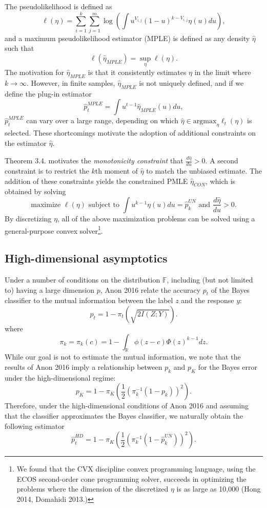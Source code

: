 \documentclass{article}
\newcommand{\argmax}{\text{argmax}}
\begin{document}
The pseudolikelihood is defined as
\begin{equation}\label{eq:psuedo}
\ell(\eta) = \sum_{i=1}^k \sum_{j=1}^{m} \log\left(\int u^{V_{i, j}} (1-u)^{k - V_{i, j}} \eta(u) du\right),
\end{equation}
and a maximum pseudolikelihood estimator (MPLE) is defined as any
density $\hat{\eta}$ such that
\[
\ell(\hat{\eta}_{MPLE}) = \sup_{\eta} \ell(\eta).
\]
The motivation for $\hat{\eta}_{MPLE}$ is that it consistently
estimates $\eta$ in the limit where $k \to \infty$.
However, in finite samples, $\hat{\eta}_{MPLE}$ is not uniquely defined,
and if we define the plug-in estimator
\[
\hat{p}_t^{MPLE} = \int u^{t-1} \hat{\eta}_{MPLE}(u) du,
\]
$\hat{p}_t^{MPLE}$ can vary over a large range, depending on which $\hat{\eta} \in \argmax_{\eta} \ell_t(\eta)$
is selected.
These shortcomings motivate the adoption of additional constraints on the estimator $\hat{\eta}.$

Theorem 3.4. motivates the \emph{monotonicity constraint} that $\frac{d\hat{\eta}}{du} > 0$.
A second constraint is to restrict the $k$th moment of $\hat{\eta}$ to match the unbiased estimate.
The addition of these constraints yields the constrained PMLE
$\hat{\eta}_{CON}$, which is obtained by solving
\[
\text{maximize }\ell(\eta) \text{ subject to }\int u^{k-1} \eta(u) du = \hat{p}_k^{UN}\text{ and }\frac{d\hat{\eta}}{du} > 0.
\]
By discretizing $\eta$, all of the above maximization problems can be solved using a general-purpose convex solver\footnote{
We found that the CVX discipline convex programming language, using the ECOS second-order cone programming solver,
succeeds in optimizing the problems where the dimension of the discretized $\eta$ is as large as 10,000 (Hong 2014, Domahidi 2013.)}.

\subsection{High-dimensional asymptotics}

Under a number of conditions on the distribution $\mathbb{F}$, including (but not limited to) having a large dimension $p$,
Anon 2016 relate the accuracy $p_t$ of the Bayes classifier to the mutual information between the label $z$ and
the response $y$:
\[
p_t = 1-\pi_t(\sqrt{2I(Z; Y)}).
\]
where
\[
\pi_k = \pi_k(c) = 1 - \int_{\mathbb{R}} \phi(z - c)  \Phi(z)^{k-1} dz.
\]
While our goal is not to estimate the mutual information, we note that the results of Anon 2016
imply a relationship between $p_k$ and $p_K$ for the Bayes error under the high-dimensional regime:
\[
p_K = 1-\pi_K\left(\frac{1}{2}(\pi_k^{-1}(1-p_k))^2\right).
\]
Therefore, under the high-dimensional conditions of Anon 2016 and assuming that the classifier approximates
the Bayes classifier, we naturally obtain the following estimator
\[
\hat{p}_t^{HD} = 1-\pi_K\left(\frac{1}{2}(\pi_k^{-1}(1-\hat{p}_k^{UN}))^2\right).
\]
\end{document}
